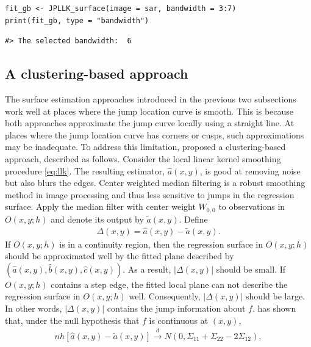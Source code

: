 \begin{verbatim}
fit_gb <- JPLLK_surface(image = sar, bandwidth = 3:7)
print(fit_gb, type = "bandwidth")
\end{verbatim}

\begin{verbatim}
#> The selected bandwidth:  6
\end{verbatim}

\subsection{A clustering-based approach}\label{sec:denoise.cluster}

The surface estimation approaches introduced in the previous two subsections work well at places where the jump location curve is smooth. This is because both approaches approximate the jump curve locally using a straight line. At places where the jump location curve has corners or cusps, such approximations may be inadequate. To address this limitation, \citet{kang2018efficient} proposed a clustering-based approach, described as follows. Consider the local linear kernel smoothing procedure \eqref{eq:llk}. The resulting estimator, \(\widehat{a}(x, y)\), is good at removing noise but also blurs the edges. Center weighted median filtering \citep{ko1991center, sun1994center} is a robust smoothing method in image processing and thus less sensitive to jumps in the regression surface. Apply the median filter with center weight \(W_{0, 0}\) to observations in \(O(x, y; h)\) and denote its output by \(\tilde{a}(x, y)\). Define
\begin{align*}
  \Delta(x, y) = \widehat{a}(x, y) - \tilde{a}(x, y).
\end{align*}
If \(O(x, y; h)\) is in a continuity region, then the regression surface in \(O(x, y; h)\) should be approximated well by the fitted plane described by \((\widehat{a}(x, y), \widehat{b}(x, y), \widehat{c}(x, y))\). As a result, \(| \Delta(x, y) |\) should be small. If \(O(x, y; h)\) contains a step edge, the fitted local plane can not describe the regression surface in \(O(x, y; h)\) well. Consequently, \(| \Delta(x, y) |\) should be large. In other words, \(| \Delta(x, y) |\) contains the jump information about \(f\). \citet{kang2018efficient} has shown that, under the null hypothesis that \(f\) is continuous at \((x, y)\),
\begin{align*}
  n h\left[ \widehat{a}(x, y) - \tilde{a}(x, y) \right] \stackrel{d}{\rightarrow} N(0, \Sigma_{11} + \Sigma_{22} - 2\Sigma_{12}),
\end{align*}
